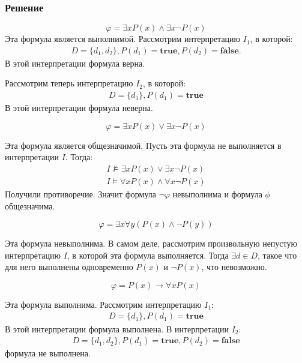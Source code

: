 \documentclass[11pt]{article}
\begin{document}
\subsubsection{Решение}
\label{sec:org8e5005d}
    \begin{equation*}
\varphi = \exists x P(x) \land \exists x \lnot P(x)
    \end{equation*}
Эта формула является выполнимой. Рассмотрим интерпретацию \(I_1\), в которой:
\begin{align*}
D = \{d_1, d_2\}, P(d_1) = \textbf{true}, P(d_2) = \textbf{false}.
\end{align*}
В этой интерпретации формула верна.

Рассмотрим теперь интерпретацию $I_2$, в которой:
\begin{align*}
D = \{d_1\}, P(d_1) = \textbf{true}
\end{align*}
В этой интерпретации формула неверна.

\begin{equation*}
\varphi = \exists x P(x) \lor \exists x \lnot P(x)
\end{equation*}

Эта формула является общезначимой. Пусть эта формула не выполняется в интерпретации \(I\). Тогда:
\begin{align*}
I \not \models \exists x P(x) \lor \exists x \lnot P(x) \\
I \models \forall x P(x) \land \forall x \lnot P(x)
\end{align*}
Получили противоречие. Значит формула $\lnot\varphi$ невыполнима и формула $\phi$ общезначима.

\begin{equation*}
\varphi = \exists x \forall y (P(x) \land \lnot P(y))
\end{equation*}

Эта формула невыполнима. В самом деле, рассмотрим произвольную непустую интерпретацию \(I\), в которой эта формула выполняется. Тогда \(\exists d \in D\), такое что для него выполнены одновременно \(P(x)\) и \(\lnot P(x)\), что невозможно.

\begin{equation*}
\varphi = P(x) \to \forall x P(x)
\end{equation*}

Эта формула выполнима. Рассмотрим интерпретацию \(I_1\):
\begin{align*}
D = \{d_1\}, P(d_1) = \textbf{true}
\end{align*}
В этой интерпретации формула выполнена. В интерпретации $I_2$:
\begin{align*}
D = \{d_1, d_2\}, P(d_1) = \textbf{true}, P(d_2) = \textbf{false}
\end{align*}
формула не выполнена.
\end{document}
